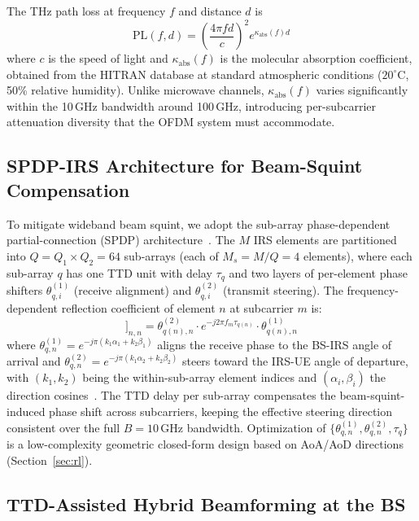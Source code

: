 \documentclass[journal,twocolumn]{IEEEtran}
\begin{document}
The THz path loss at frequency $f$ and distance $d$ is
\begin{equation}
\text{PL}(f, d) = \left(\frac{4\pi f d}{c}\right)^2 e^{\kappa_{\text{abs}}(f) d}
\label{eq:pathloss}
\end{equation}
where $c$ is the speed of light and $\kappa_{\text{abs}}(f)$ is the molecular absorption coefficient, obtained from the HITRAN database at standard atmospheric conditions ($20^\circ$C, 50\% relative humidity). Unlike microwave channels, $\kappa_{\text{abs}}(f)$ varies significantly within the 10\,GHz bandwidth around 100\,GHz, introducing per-subcarrier attenuation diversity that the OFDM system must accommodate.

\subsection{SPDP-IRS Architecture for Beam-Squint Compensation}

To mitigate wideband beam squint, we adopt the sub-array phase-dependent partial-connection (SPDP) architecture~\cite{su2023wideband}. The $M$ IRS elements are partitioned into $Q = Q_1 \times Q_2 = 64$ sub-arrays (each of $M_s = M/Q = 4$ elements), where each sub-array $q$ has one TTD unit with delay $\tau_q$ and two layers of per-element phase shifters $\theta_{q,i}^{(1)}$ (receive alignment) and $\theta_{q,i}^{(2)}$ (transmit steering). The frequency-dependent reflection coefficient of element $n$ at subcarrier $m$ is:
\begin{equation}
[\bm{\Phi}[m]]_{n,n} = \theta_{q(n),n}^{(2)} \cdot e^{-j2\pi f_m \tau_{q(n)}} \cdot \theta_{q(n),n}^{(1)}
\label{eq:spdp}
\end{equation}
where $\theta_{q,n}^{(1)} = e^{-j\pi(k_1 \alpha_1 + k_2 \beta_1)}$ aligns the receive phase to the BS-IRS angle of arrival and $\theta_{q,n}^{(2)} = e^{-j\pi(k_1 \alpha_2 + k_2 \beta_2)}$ steers toward the IRS-UE angle of departure, with $(k_1, k_2)$ being the within-sub-array element indices and $(\alpha_i, \beta_i)$ the direction cosines~\cite{su2023wideband}. The TTD delay per sub-array compensates the beam-squint-induced phase shift across subcarriers, keeping the effective steering direction consistent over the full $B=10\,\text{GHz}$ bandwidth. Optimization of $\{\theta_{q,n}^{(1)}, \theta_{q,n}^{(2)}, \tau_q\}$ is a low-complexity geometric closed-form design based on AoA/AoD directions (Section~\ref{sec:rl}).

\subsection{TTD-Assisted Hybrid Beamforming at the BS}
\end{document}
